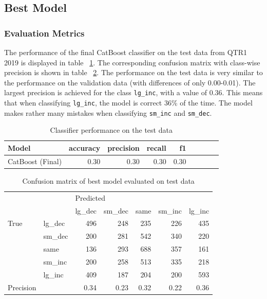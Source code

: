 \documentclass{article}
\begin{document}
	\subsection{Best Model}
	
	\subsubsection{Evaluation Metrics}

	The performance of the final CatBoost classifier on the test data from QTR1 2019 is displayed in table ~\ref{table:results_test}. The corresponding confusion matrix with class-wise precision is shown in table ~\ref{table:best_model_cm_abs}. The performance on the test data is very similar to the performance on the validation data (with differences of only 0.00-0.01). The largest precision is achieved for the class \lstinline{lg_inc}, with a value of 0.36. This means that when classifying \lstinline{lg_inc}, the model is correct 36\% of the time. The model makes rather many mistakes when classifying \lstinline{sm_inc} and \lstinline{sm_dec}.

	\begin{table}[h!]
	\centering
	\caption{Classifier performance on the test data}
	\label{table:results_test}
	
	\begin{tabular}{lrrrrrrrr}
		\toprule
		Model &     accuracy &     precision &     recall &    f1 \\
		\midrule
		CatBoost (Final)   &  0.30 &  0.30 &   0.30 &  0.30 \\
		\bottomrule
	\end{tabular}
	
	\end{table}%


	\begin{table}[h!]
	\centering
	\caption{Confusion matrix of best model evaluated on test data}
	\label{table:best_model_cm_abs}
	
	\begin{tabular}{llrrrrr}
		\toprule
		&        & \multicolumn{5}{l}{Predicted} \\
		&        &    lg\_dec & sm\_dec & same & sm\_inc & lg\_inc \\
		\midrule
		True & lg\_dec &       496 &    248 &  235 &    226 &    435 \\
		& sm\_dec &       200 &    281 &  542 &    340 &    220 \\
		& same &       136 &    293 &  688 &    357 &    161 \\
		& sm\_inc &       200 &    258 &  513 &    335 &    218 \\
		& lg\_inc &       409 &    187 &  204 &    200 &    593 \\
\bottomrule
		Precision &  &    0.34 &  0.23 &  0.32 &   0.22 &    0.36 \\
		\bottomrule
	\end{tabular}

	\end{table}%
\end{document}
